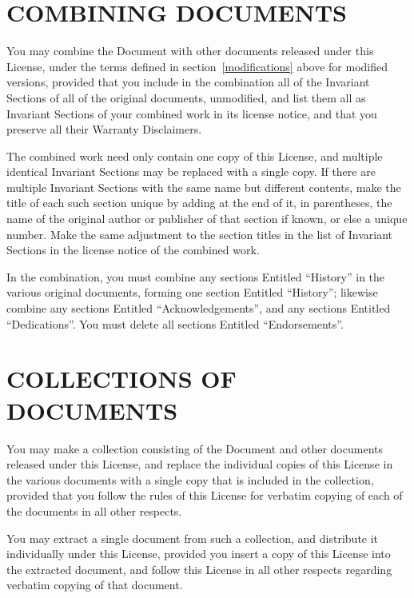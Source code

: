 \documentclass[10pt,a4paper,titlepage,twoside,openright]{report}
\begin{document}
\section*{COMBINING DOCUMENTS}
\label{combining}

You may combine the Document with other documents released under this
License, under the terms defined in section~\ref{modifications}
above for modified
versions, provided that you include in the combination all of the
Invariant Sections of all of the original documents, unmodified, and
list them all as Invariant Sections of your combined work in its
license notice, and that you preserve all their Warranty Disclaimers.

The combined work need only contain one copy of this License, and
multiple identical Invariant Sections may be replaced with a single
copy.  If there are multiple Invariant Sections with the same name but
different contents, make the title of each such section unique by
adding at the end of it, in parentheses, the name of the original
author or publisher of that section if known, or else a unique number.
Make the same adjustment to the section titles in the list of
Invariant Sections in the license notice of the combined work.

In the combination, you must combine any sections Entitled ``History''
in the various original documents, forming one section Entitled
``History''; likewise combine any sections Entitled ``Acknowledgements'',
and any sections Entitled ``Dedications''.  You must delete all sections
Entitled ``Endorsements''.


\section*{COLLECTIONS OF DOCUMENTS}
\label{collections}

You may make a collection consisting of the Document and other documents
released under this License, and replace the individual copies of this
License in the various documents with a single copy that is included in
the collection, provided that you follow the rules of this License for
verbatim copying of each of the documents in all other respects.

You may extract a single document from such a collection, and distribute
it individually under this License, provided you insert a copy of this
License into the extracted document, and follow this License in all
other respects regarding verbatim copying of that document.
\end{document}
